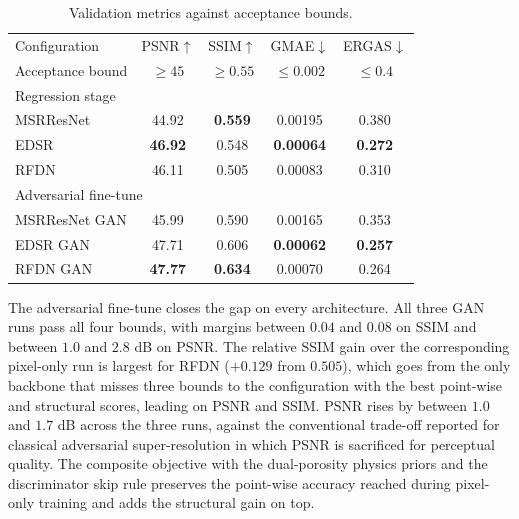 \begin{table}[t]
\captionsetup{justification=centering}
\centering
\caption{Validation metrics against acceptance bounds.}
\label{tab:val_metrics}
\small
\setlength{\tabcolsep}{6pt}
\begin{tabular}{l cccc}
\toprule
Configuration
  & PSNR$\uparrow$ & SSIM$\uparrow$ & GMAE$\downarrow$ & ERGAS$\downarrow$ \\
Acceptance bound
  & $\geq 45$ & $\geq 0.55$ & $\leq 0.002$ & $\leq 0.4$ \\
\midrule
\multicolumn{5}{l}{Regression stage} \\
\midrule
MSRResNet & 44.92          & \textbf{0.559} & 0.00195          & 0.380          \\
EDSR      & \textbf{46.92} & 0.548          & \textbf{0.00064} & \textbf{0.272} \\
RFDN      & 46.11          & 0.505          & 0.00083          & 0.310          \\
\midrule
\multicolumn{5}{l}{Adversarial fine-tune} \\
\midrule
MSRResNet GAN & 45.99          & 0.590          & 0.00165          & 0.353          \\
EDSR GAN      & 47.71          & 0.606          & \textbf{0.00062} & \textbf{0.257} \\
RFDN GAN      & \textbf{47.77} & \textbf{0.634} & 0.00070          & 0.264          \\
\bottomrule
\end{tabular}
\end{table}

The adversarial fine-tune closes the gap on every architecture. All three GAN runs pass all four bounds, with margins between $0.04$ and $0.08$ on SSIM and between $1.0$ and $2.8$ dB on PSNR. The relative SSIM gain over the corresponding pixel-only run is largest for RFDN ($+0.129$ from $0.505$), which goes from the only backbone that misses three bounds to the configuration with the best point-wise and structural scores, leading on PSNR and SSIM. PSNR rises by between $1.0$ and $1.7$ dB across the three runs, against the conventional trade-off reported for classical adversarial super-resolution in which PSNR is sacrificed for perceptual quality. The composite objective with the dual-porosity physics priors and the discriminator skip rule preserves the point-wise accuracy reached during pixel-only training and adds the structural gain on top.

